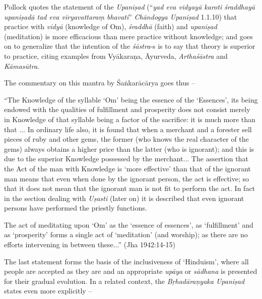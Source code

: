 Pollock quotes the statement of the {\sl Upaniṣad} (``{\sl yad eva vidyayā karoti śraddhayā upaniṣadā tad eva vīryavattaraṃ bhavati}'' {\sl Chāndogya Upaniṣad} 1.1.10) that practice with {\sl vidyā} (knowledge of Om), {\sl śraddhā} (faith) and {\sl upaniṣad} (meditation) is more efficacious than mere practice without knowledge; and goes on to generalize that the intention of the {\sl śāstra}-s is to say that theory is superior to practice, citing examples from Vyākaraṇa, Āyurveda, {\sl Arthaśāstra} and {\sl Kāmasūtra}.

\newpage

The commentary on this mantra by Śaṅkarācārya goes thus --

\begin{myquote}
``The Knowledge of the syllable `Om' being the essence of the `Essences', its being endowed with the qualities of fulﬁllment and prosperity does not consist merely in Knowledge of that syllable being a factor of the sacriﬁce: it is much more than that ... In ordinary life also, it is found that when a merchant and a forester sell pieces of ruby and other gems, the former (who knows the real character of the gems) always obtains a higher price than the	latter (who is ignorant); and this is due to the superior Knowledge possessed by the merchant... The assertion that the Act of the man with Knowledge is `more effective' than that of the ignorant man means that even when done by the ignorant person, the act is effective; so that it does not mean that the ignorant man is not ﬁt to perform the act. In fact in the section dealing with {\sl Uṣasti} (later on) it is described that even ignorant persons have performed the priestly functions.

The act of meditating upon `Om' as the `essence of essences', as `fulfillment' and as `prosperity' forms a single act of `meditation' (and worship); as there are no efforts intervening in between these...'' (Jha 1942:14-15)
\end{myquote}

The last statement forms the basis of the inclusiveness of `Hinduism', where all people are accepted as they are and an appropriate {\sl upāya} or {\sl sādhana} is presented for their gradual evolution. In a related context, the {\sl Bṛhadāraṇyaka Upaniṣad} states even more explicitly --

